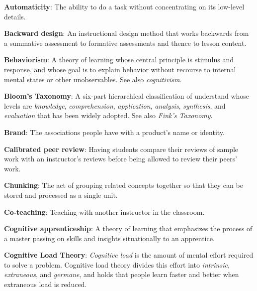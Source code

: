 \textbf{\hypertarget{g:automaticity}{Automaticity}\label{g:automaticity}}: The ability to do a task
without concentrating on its low-level details.

\textbf{\hypertarget{g:backward-design}{Backward design}\label{g:backward-design}}: An instructional design
method that works backwards from a summative assessment to formative
assessments and thence to lesson content.

\textbf{\hypertarget{g:behaviorism}{Behaviorism}\label{g:behaviorism}}: A theory of learning whose
central principle is stimulus and response, and whose goal is to explain
behavior without recourse to internal mental states or other
unobservables. See also \emph{cognitivism}.

\textbf{\hypertarget{g:blooms-taxonomy}{Bloom's Taxonomy}\label{g:blooms-taxonomy}}: A six-part
hierarchical classification of understand whose levels are \emph{knowledge},
\emph{comprehension}, \emph{application}, \emph{analysis}, \emph{synthesis}, and
\emph{evaluation} that has been widely adopted. See also \emph{Fink's Taxonomy}.

\textbf{\hypertarget{g:brand}{Brand}\label{g:brand}}: The associations people have with a
product's name or identity.

\textbf{\hypertarget{g:calibrated-peer-review}{Calibrated peer review}\label{g:calibrated-peer-review}}: Having
students compare their reviews of sample work with an instructor's
reviews before being allowed to review their peers' work.

\textbf{\hypertarget{g:chunking}{Chunking}\label{g:chunking}}: The act of grouping related concepts
together so that they can be stored and processed as a single unit.

\textbf{\hypertarget{g:co-teaching}{Co-teaching}\label{g:co-teaching}}: Teaching with another
instructor in the classroom.

\textbf{\hypertarget{g:cognitive-apprenticeship}{Cognitive apprenticeship}\label{g:cognitive-apprenticeship}}: A
theory of learning that emphasizes the process of a master passing on
skills and insights situationally to an apprentice.

\textbf{\hypertarget{g:cognitive-load-theory}{Cognitive Load Theory}\label{g:cognitive-load-theory}}: \emph{Cognitive
load} is the amount of mental effort required to solve a problem.
Cognitive load theory divides this effort into \emph{intrinsic},
\emph{extraneous}, and \emph{germane}, and holds that people learn faster and
better when extraneous load is reduced.

